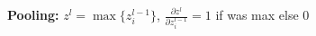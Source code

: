 \textbf{Pooling:} $z^{l} = \max\{ z_i^{l-1}\}$, $\frac{\partial z^{l}}{\partial z_i^{l-1}} = 1$ if was max else $0$\\

